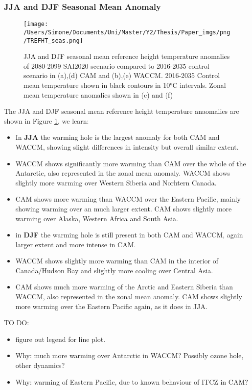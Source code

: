 \subsubsection{JJA and DJF Seasonal Mean Anomaly}

\begin{figure}[H]
	\centering
	\texttt{[image: /Users/Simone/Documents/Uni/Master/Y2/Thesis/Paper\_imgs/png/TREFHT\_seas.png]}
	\caption{JJA and DJF seasonal mean reference height temperature anomalies of 2080-2099 SAI2020 scenario compared to 2016-2035 control scenario in (a),(d) CAM and (b),(e) WACCM. 2016-2035 Control mean temperature shown in black contours in 10°C intervals. Zonal mean temperature anomalies shown in (c) and (f)}
	\label{fig:TREFHT_seas}
\end{figure}

The JJA and DJF seasonal mean reference height temperature anaomalies are shown in Figure \ref{fig:TREFHT_seas}, we learn:

\begin{itemize}
	\item In \textbf{JJA} the warming hole is the largest anomaly for both CAM and WACCM, showing slight differences in intensity but overall similar extent.
	\item WACCM shows significantly more warming than CAM over the whole of the Antarctic, also represented in the zonal mean anomaly. WACCM shows slightly more warming over Western Siberia and Norhtern Canada. 
	\item CAM shows more warming than WACCM over the Eastern Pacific, mainly showing warming over an much larger extent. CAM shows slightly more warming over Alaska, Western Africa and South Asia. 
	\item in \textbf{DJF} the warming hole is still present in both CAM and WACCM, again larger extent and more intense in CAM. 
	\item WACCM shows slightly more warming than CAM in the interior of Canada/Hudson Bay and slightly more cooling over Central Asia. 
	\item CAM shows much more warming of the Arctic and Eastern Siberia than WACCM, also represented in the zonal mean anomaly. CAM shows slightly more warming over the Eastern Pacific again, as it does in JJA.
\end{itemize}

TO DO:
\begin{itemize}
	\item figure out legend for line plot.
	\item Why: much more warming over Antarctic in WACCM? Possibly ozone hole, other dynamics?
	\item Why: warming of Eastern Pacific, due to known behaviour of ITCZ in CAM?
\end{itemize}


